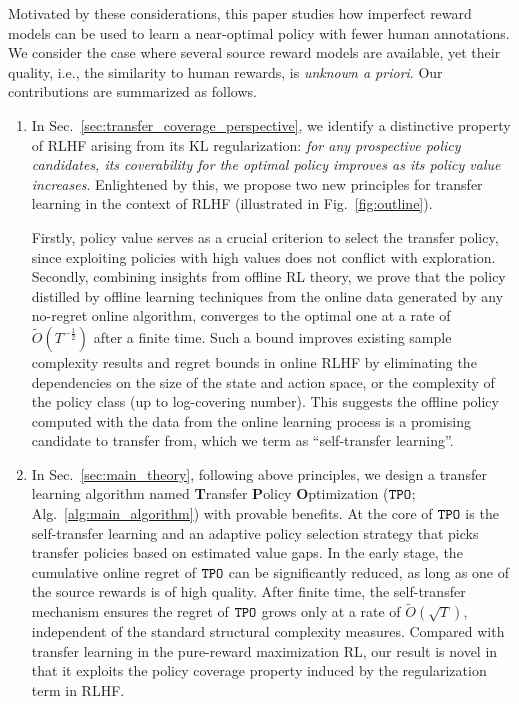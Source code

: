 %
%

%
%
%
%
%
%
%
%

Motivated by these considerations, this paper studies how imperfect reward models can be used to learn a near-optimal policy with fewer human annotations. We consider the case where several source reward models are available, yet their quality, i.e., the similarity to human rewards, is \emph{unknown a priori}.
%
%
%
%
%
%
%
%
%
Our contributions are summarized as follows.
%
\begin{enumerate}[leftmargin=0.2cm, itemsep=0.3pt]
\item[\textbullet] In Sec.~\ref{sec:transfer_coverage_perspective}, we identify a distinctive property of RLHF arising from its KL regularization: \emph{for any prospective policy candidates, its coverability for the optimal policy improves as its policy value increases}.
Enlightened by this, we propose two new principles for transfer learning in the context of RLHF (illustrated in Fig.~\ref{fig:outline}).

Firstly, policy value serves as a crucial criterion to select the transfer policy, since exploiting policies with high values does not conflict with exploration.
Secondly, combining insights from offline RL theory, we prove that the policy distilled by offline learning techniques from the online data generated by any no-regret online algorithm, converges to the optimal one at a rate of $\tilde{O}(T^{-\frac{1}{2}})$ after a finite time.
Such a bound improves existing sample complexity results and regret bounds in online RLHF by eliminating the dependencies on the size of the state and action space, or the complexity of the policy class (up to log-covering number).
This suggests the offline policy computed with the data from the online learning process is a promising candidate to transfer from, which we term as ``self-transfer learning''.

%
%
%
%
%

%
%
%
%
%
%
%
%
%
%


%
%
%
%

%
%
%
%

%
%

%
%
%
%


\item[\textbullet] In Sec.~\ref{sec:main_theory}, following above principles, we design a transfer learning algorithm named \textbf{T}ransfer \textbf{P}olicy \textbf{O}ptimization (${\texttt{TPO}}$; Alg.~\ref{alg:main_algorithm}) with provable benefits.
At the core of ${\texttt{TPO}}$ is the self-transfer learning and an adaptive policy selection strategy that picks transfer policies based on estimated value gaps.
In the early stage, the cumulative online regret of ${\texttt{TPO}}$ can be significantly reduced, as long as one of the source rewards is of high quality.
After finite time, the self-transfer mechanism ensures the regret of ${\texttt{TPO}}$ grows only at a rate of $\tilde{O}(\sqrt{T})$, independent of the standard structural complexity measures. 
Compared with transfer learning in the pure-reward maximization RL, our result is novel in that it exploits the policy coverage property induced by the regularization term in RLHF.



\end{enumerate}
